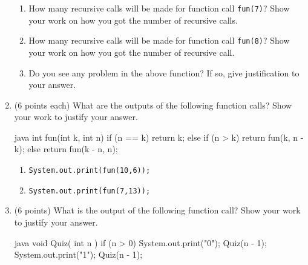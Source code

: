 \documentclass[12pt, a4paper]{article}
\begin{document}
\begin{enumerate}
    \begin{enumerate}
        
        \item How many recursive calls will be made for function call \verb|fun(7)|?
            Show your work on how you got the number of recursive calls.
        
        \item How many recursive calls will be made for function call \verb|fun(8)|?
            Show your work on how you got the number of recursive call.

        \item Do you see any problem in the above function?
            If so, give justification to your answer.
    
    \end{enumerate}



    \newpage

    

    \item (6 points each) What are the outputs of the following function calls?
        Show your work to justify your answer.
    \begin{MintedUnbreakableCodeBlock}{java}
        int fun(int k, int n)
        {
            if (n == k) { return k; }
            else {
                if (n > k) { return fun(k, n - k); }
                else { return fun(k - n, n); }
            }
        }\end{MintedUnbreakableCodeBlock}

    \begin{enumerate}
        
        \item \verb|System.out.print(fun(10,6));|

        \item \verb|System.out.print(fun(7,13));|
    
    \end{enumerate}



    \newpage



    \item (6 points) What is the output of the following function call?
        Show your work to justify your answer.
    \begin{MintedUnbreakableCodeBlock}{java}
        void Quiz( int n ) {
            if (n > 0) {
                System.out.print("0");
                Quiz(n - 1);
                System.out.print("1");
                Quiz(n - 1);
            }
        }\end{MintedUnbreakableCodeBlock}


\end{enumerate}
\end{document}

